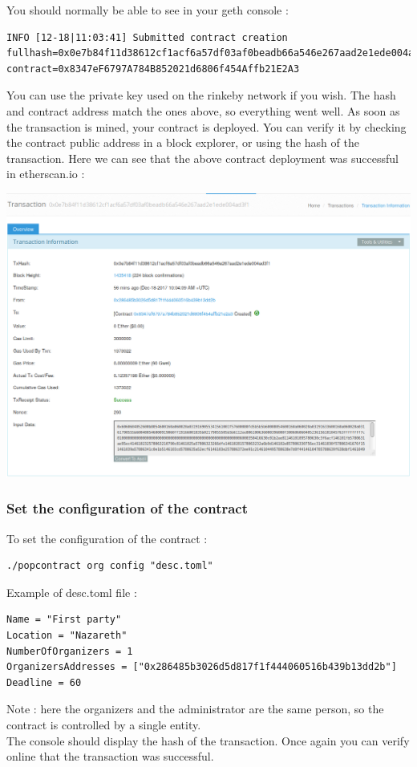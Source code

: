 \documentclass[11pt, a4paper, twoside, openright]{article} %
\begin{document}
You should normally be able to see in your geth console :
\begin{verbatim}
INFO [12-18|11:03:41] Submitted contract creation
fullhash=0x0e7b84f11d38612cf1acf6a57df03af0beadb66a546e267aad2e1ede004ad3f1
contract=0x8347eF6797A784B852021d6806f454Affb21E2A3
\end{verbatim}
You can use the private key used on the rinkeby network if you wish.
The hash and contract address match the ones above, so everything went well.
As soon as the transaction is mined, your contract is deployed. You can verify it by checking the contract public address in a block explorer, or using the hash of the transaction. Here we can see that the above contract deployment was successful in etherscan.io :
\begin{center}
 \includegraphics[scale=0.38]{blockexplorer.jpg}
\end{center}
\subsubsection*{Set the configuration of the contract}

To set the configuration of the contract :
\begin{verbatim}
./popcontract org config "desc.toml"
\end{verbatim}
Example of desc.toml file :
\begin{verbatim}
Name = "First party"
Location = "Nazareth"
NumberOfOrganizers = 1
OrganizersAddresses = ["0x286485b3026d5d817f1f444060516b439b13dd2b"]
Deadline = 60
\end{verbatim}
Note : here the organizers and the administrator are the same person, so the contract is controlled by a single entity.\\
The console should display the hash of the transaction. Once again you can verify online that the transaction was successful.
\end{document}
